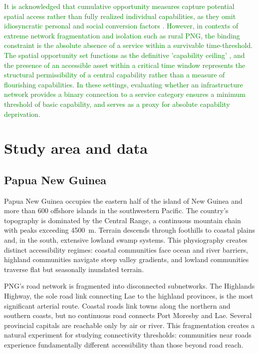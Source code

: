 \documentclass[review,3p,authoryear]{elsarticle}
\begin{document}
\textcolor{green}{It is acknowledged that cumulative opportunity measures capture potential spatial access rather than fully realized individual capabilities, as they omit idiosyncratic personal and social conversion factors \citep{robeyns2005capability}. However, in contexts of extreme network fragmentation and isolation such as rural PNG, the binding constraint is the absolute absence of a service within a survivable time-threshold. The spatial opportunity set functions as the definitive 'capability ceiling' \citep{thomopoulos2009incorporating}, and the presence of an accessible asset within a critical time window represents the structural permissibility of a central capability rather than a measure of flourishing capabilities. In these settings, evaluating whether an infrastructure network provides a binary connection to a service category ensures a minimum threshold of basic capability, and serves as a proxy for absolute capability deprivation.}

\section{Study area and data}
\label{sec:data}

\subsection{Papua New Guinea}

Papua New Guinea occupies the eastern half of the island of New Guinea and more than 600 offshore islands in the southwestern Pacific. The country's topography is dominated by the Central Range, a continuous mountain chain with peaks exceeding \SI{4500}{\metre}. Terrain descends through foothills to coastal plains and, in the south, extensive lowland swamp systems. This physiography creates distinct accessibility regimes: coastal communities face ocean and river barriers, highland communities navigate steep valley gradients, and lowland communities traverse flat but seasonally inundated terrain.

PNG's road network is fragmented into disconnected subnetworks. The Highlands Highway, the sole road link connecting Lae to the highland provinces, is the most significant arterial route. Coastal roads link towns along the northern and southern coasts, but no continuous road connects Port Moresby and Lae. Several provincial capitals are reachable only by air or river. This fragmentation creates a natural experiment for studying connectivity thresholds: communities near roads experience fundamentally different accessibility than those beyond road reach.
\end{document}
